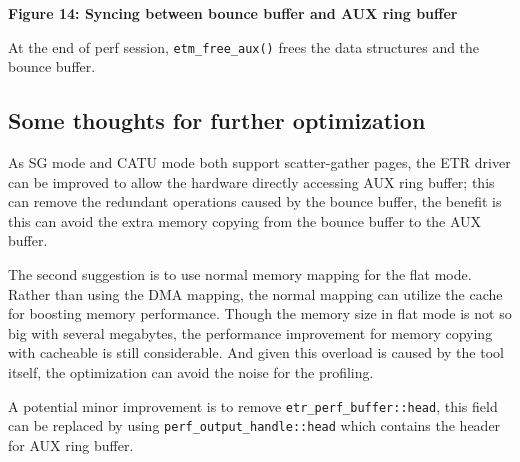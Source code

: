 \documentclass[11pt]{diazessay} %
\def\code#1{\texttt{#1}}
\begin{document}
\begin{center}
\par
{}
\par
\textbf{Figure 14: Syncing between bounce buffer and AUX ring buffer}
\end{center}

At the end of perf session, \code{etm\_free\_aux()} frees the data structures and the bounce buffer.

\subsection*{Some thoughts for further optimization}

As SG mode and CATU mode both support scatter-gather pages, the ETR driver can be improved to allow the hardware directly accessing AUX ring buffer; this can remove the redundant operations caused by the bounce buffer, the benefit is this can avoid the extra memory copying from the bounce buffer to the AUX buffer.

The second suggestion is to use normal memory mapping for the flat mode.  Rather than using the DMA mapping, the normal mapping can utilize the cache for boosting memory performance.  Though the memory size in flat mode is not so big with several megabytes, the performance improvement for memory copying with cacheable is still considerable.  And given this overload is caused by the tool itself, the optimization can avoid the noise for the profiling.

A potential minor improvement is to remove \code{etr\_perf\_buffer::head}, this field can be replaced by using \code{perf\_output\_handle::head} which contains the header for AUX ring buffer.
\end{document}
